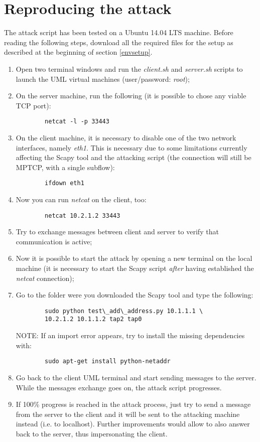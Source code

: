 \section{Reproducing the attack}
\label{reprattack}
The attack script has been tested on a Ubuntu 14.04 LTS machine. Before reading the following steps, download all the required files for the setup as described at the beginning of section \ref{envsetup}.

\begin{enumerate}
\item
    Open two terminal windows and run the \textit{client.sh} and \textit{server.sh} scripts to launch the UML virtual machines (user/password: \textit{root});
\item
    On the server machine, run the following (it is possible to chose any viable TCP port):
\begin{verbatim}
        netcat -l -p 33443
\end{verbatim}
\item
    On the client machine, it is necessary to disable one of the two network interfaces, namely \textit{eth1}. This is necessary due to some limitations currently affecting the Scapy tool and the attacking script (the connection will still be MPTCP, with a single subflow):
\begin{verbatim}
        ifdown eth1
\end{verbatim}
\item
    Now you can run \textit{netcat} on the client, too:
\begin{verbatim}
        netcat 10.2.1.2 33443
\end{verbatim}
\item
    Try to exchange messages between client and server to verify that communication is active;
\item
    Now it is possible to start the attack by opening a new terminal on the local machine (it is necessary to start the Scapy script \textit{after} having established the \textit{netcat} connection);
\item
    Go to the folder were you downloaded the Scapy tool and type the following:
\begin{verbatim}
        sudo python test\_add\_address.py 10.1.1.1 \
        10.2.1.2 10.1.1.2 tap2 tap0
\end{verbatim}
    NOTE: If an import error appears, try to install the missing dependencies with:
\begin{verbatim}
        sudo apt-get install python-netaddr
\end{verbatim}
\item
    Go back to the client UML terminal and start sending messages to the server. While the messages exchange goes on, the attack script progresses. 
\item
    If 100\% progress is reached in the attack process, just try to send a message from the server to the client and it will be sent to the attacking machine instead (i.e. to localhost). Further improvements would allow to also answer back to the server, thus impersonating the client.
\end{enumerate} 

